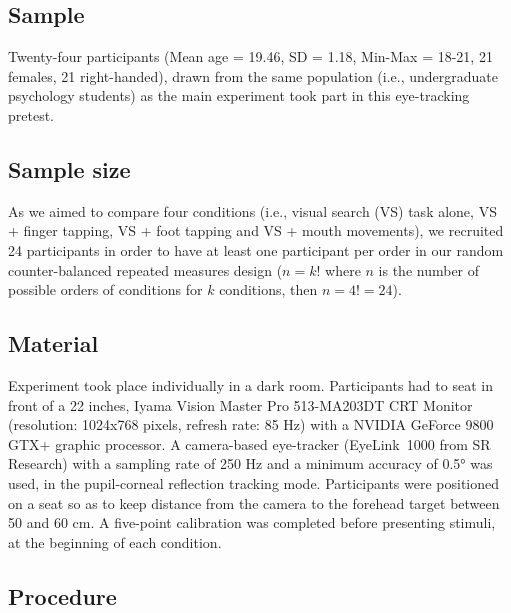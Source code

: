 \documentclass[12pt,]{book}
\begin{document}
\subsection*{Sample}\label{sample-1}

Twenty-four participants (Mean age = 19.46, SD = 1.18, Min-Max = 18-21,
21 females, 21 right-handed), drawn from the same population (i.e.,
undergraduate psychology students) as the main experiment took part in
this eye-tracking pretest.

\subsection*{Sample size}\label{sample-size}

As we aimed to compare four conditions (i.e., visual search (VS) task
alone, VS + finger tapping, VS + foot tapping and VS + mouth movements),
we recruited 24 participants in order to have at least one participant
per order in our random counter-balanced repeated measures design
(\(n = k!\) where \(n\) is the number of possible orders of conditions
for \(k\) conditions, then \(n =4 != 24\)).

\subsection*{Material}\label{material-1}

Experiment took place individually in a dark room. Participants had to
seat in front of a 22 inches, Iyama Vision Master Pro 513-MA203DT CRT
Monitor (resolution: 1024x768 pixels, refresh rate: 85 Hz) with a NVIDIA
GeForce 9800 GTX+ graphic processor. A camera-based eye-tracker
(EyeLink\textregistered~1000 from SR Research) with a sampling rate of
250 Hz and a minimum accuracy of 0.5° was used, in the pupil-corneal
reflection tracking mode. Participants were positioned on a seat so as
to keep distance from the camera to the forehead target between 50 and
60 cm. A five-point calibration was completed before presenting stimuli,
at the beginning of each condition.

\subsection*{Procedure}\label{procedure-1}
\end{document}

